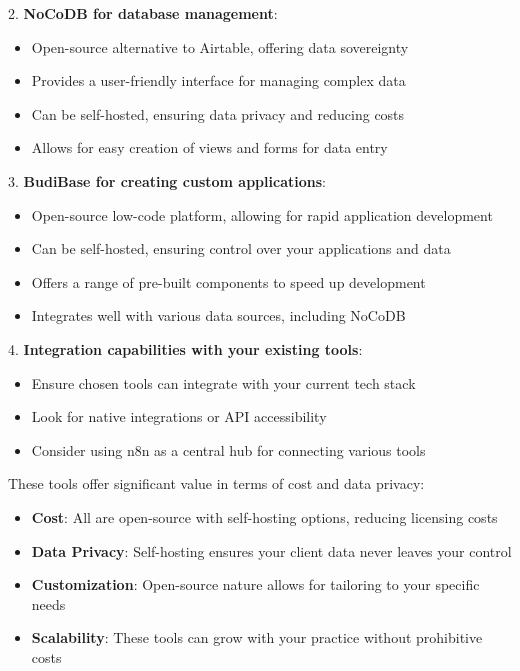 2. \textbf{NoCoDB for database management}:
   \begin{itemize}
     \item Open-source alternative to Airtable, offering data sovereignty
     \item Provides a user-friendly interface for managing complex data
     \item Can be self-hosted, ensuring data privacy and reducing costs
     \item Allows for easy creation of views and forms for data entry
   \end{itemize}

3. \textbf{BudiBase for creating custom applications}:
   \begin{itemize}
     \item Open-source low-code platform, allowing for rapid application development
     \item Can be self-hosted, ensuring control over your applications and data
     \item Offers a range of pre-built components to speed up development
     \item Integrates well with various data sources, including NoCoDB
   \end{itemize}

4. \textbf{Integration capabilities with your existing tools}:
   \begin{itemize}
     \item Ensure chosen tools can integrate with your current tech stack
     \item Look for native integrations or API accessibility
     \item Consider using n8n as a central hub for connecting various tools
   \end{itemize}

These tools offer significant value in terms of cost and data privacy:
\begin{itemize}
  \item \textbf{Cost}: All are open-source with self-hosting options, reducing licensing costs
  \item \textbf{Data Privacy}: Self-hosting ensures your client data never leaves your control
  \item \textbf{Customization}: Open-source nature allows for tailoring to your specific needs
  \item \textbf{Scalability}: These tools can grow with your practice without prohibitive costs
\end{itemize}

